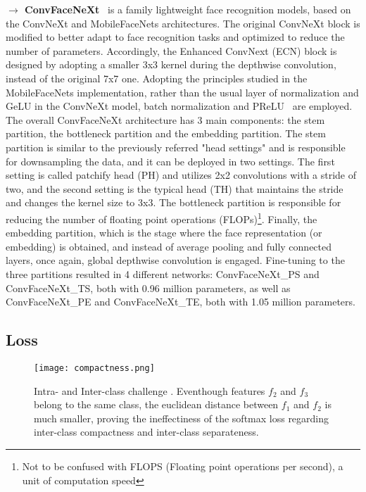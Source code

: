 \documentclass[class=report, crop=false, a4paper, 12pt]{standalone}
\begin{document}
\vspace{0.7\baselineskip}
\noindent\textbf{$\rightarrow$ ConvFaceNeXt}~\autocite{hooConvFaceNeXtLightweightNetworks2022} is a family lightweight face recognition models, based on the ConvNeXt and MobileFaceNets architectures. The original ConvNeXt block is modified to better adapt to face recognition tasks and optimized to reduce the number of parameters. Accordingly, the Enhanced ConvNext (ECN) block is designed by adopting a smaller 3x3 kernel during the depthwise convolution, instead of the original 7x7 one. Adopting the principles studied in the MobileFaceNets implementation, rather than the usual layer of normalization and GeLU in the ConvNeXt model, batch normalization and PReLU~\autocite{heDelvingDeepRectifiers2015} are employed. The overall ConvFaceNeXt architecture has 3 main components: the stem partition, the bottleneck partition and the embedding partition. The stem partition is similar to the previously referred "head settings" and is responsible for downsampling the data, and it can be deployed in two settings. The first setting is called patchify head (PH) and utilizes 2x2 convolutions with a stride of two, and the second setting is the typical head (TH) that maintains the stride and changes the kernel size to 3x3. The bottleneck partition is responsible for reducing the number of floating point operations (FLOPs)\footnote{Not to be confused with FLOPS (Floating point operations per second), a unit of computation speed}. Finally, the embedding partition, which is the stage where the face representation (or embedding) is obtained, and instead of average pooling and fully connected layers, once again, global depthwise convolution is engaged. Fine-tuning to the three partitions resulted in 4 different networks: ConvFaceNeXt\_PS and ConvFaceNeXt\_TS, both with 0.96 million parameters, as well as ConvFaceNeXt\_PE and ConvFaceNeXt\_TE, both with 1.05 million parameters.

\subsection{Loss}

\begin{figure}[!h]
    \centering
    \texttt{[image: compactness.png]}
    \caption{Intra- and Inter-class challenge \autocite{wangNormFaceL2Hypersphere2017}. Eventhough features $f_2$ and $f_3$ belong to the same class, the euclidean distance between $f_1$ and $f_2$ is much smaller, proving the ineffectiness of the softmax loss regarding inter-class compactness and inter-class separateness.}
    \label{fig:compactness}
\end{figure}
\end{document}

